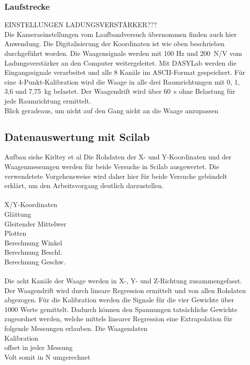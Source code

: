 \subsubsection{Laufstrecke}
EINSTELLUNGEN LADUNGSVERSTÄRKER???\\
Die Kameraeinstellungen vom Laufbandversuch übernommen finden auch hier Anwendung. Die Digitalisierung der Koordinaten ist wie oben beschrieben durchgeführt worden. Die Waagensignale werden mit 100 Hz und 200~N/V vom Ladungsverstärker an den Computer weitergeleitet. Mit DASYLab werden die Eingangssignale verarbeitet und alle 8 Kanäle im ASCII-Format gespeichert.
Für eine 4-Punkt-Kalibration wird die Waage in alle drei Raumrichtungen mit 0, 1, 3,6 und 7,75~kg belastet. Der Waagendrift wird über 60~s ohne Belastung für jede Raumrichtung ermittelt.\\
Blick geradeaus, um nicht auf den Gang nicht an die Waage anzupassen


\subsection{Datenauswertung mit Scilab}
Aufbau siehe Kirltey et al
Die Rohdaten der X- und Y-Koordinaten und der Waagenmessungen werden für beide Versuche in Scilab ausgewertet. Die verwendetete Vorgehensweise wird daher hier für beide Versuche gebündelt erklärt, um den Arbeitsvorgang deutlich darzustellen.\\\\
X/Y-Koordinaten\\
Glättung\\
Gleitender Mittelwer\\
Plotten\\
Berechnung Winkel\\
Berechnung Beschl.\\
Berechnung Geschw.\\
\\
Die acht Kanäle der Waage werden in X-, Y- und Z-Richtung zusammengefasst. Der Waagendrift wird durch lineare Regression ermittelt und von allen Rohdaten abgezogen.
Für die Kalibration werden die Signale für die vier Gewichte über 1000 Werte gemittelt. Dadurch können den Spannungen tatsächliche Gewichte zugeordnet werden, welche mittels linearer Regression eine Extrapolation für folgende Messungen erlauben. Die 
Waagendaten\\
Kalibration\\
offset in jeder Messung\\
Volt somit in N umgerechnet\\

